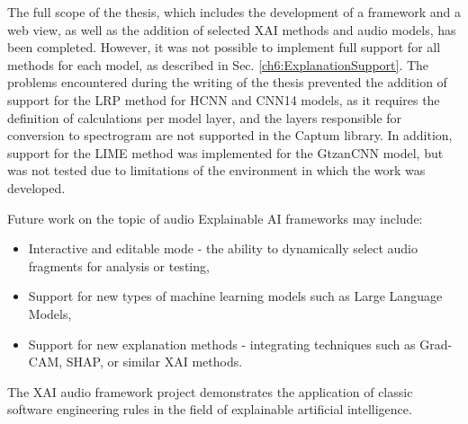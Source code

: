 \documentclass[
    bindingoffset=5mm,  %
    footnoteindent=3mm, %
    hyphenation=true    %
]{src/wut-thesis}
\begin{document}
The full scope of the thesis, which includes the development of a framework and a web view,
as well as the addition of selected XAI methods and audio models, has been completed.
However, it was not possible to implement full support for all methods for each model, 
as described in Sec. \ref{ch6:ExplanationSupport}.
The problems encountered during the writing of the thesis prevented the
addition of support for the LRP method for HCNN and CNN14 models, as it requires the definition
of calculations per model layer, and the layers responsible for conversion to spectrogram are
not supported in the Captum library. In addition, support for the LIME method was implemented for
the GtzanCNN model, but was not tested due to limitations of the environment in which the work was developed.

Future work on the topic of audio Explainable AI frameworks may include:
\begin{itemize}
    \item Interactive and editable mode - the ability to dynamically select audio fragments for 
          analysis or testing,
    \item Support for new types of machine learning models such as Large Language Models,
    \item Support for new explanation methods - integrating techniques such as Grad-CAM, SHAP,
        or similar XAI methods.
\end{itemize}

The XAI audio framework project demonstrates the application of classic software engineering rules
in the field of explainable artificial intelligence.

\cleardoublepage %
\printbibliography
\clearpage

\acronymlist
{}
\vspace{0.8cm}

\pagestyle{plain}
\end{document}
